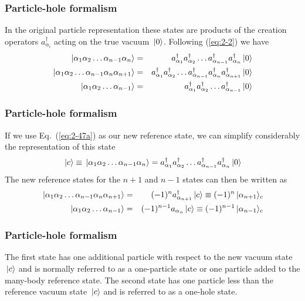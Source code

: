 \frame
{
  \frametitle{Particle-hole formalism}
\begin{small}
{\scriptsize
In the original particle representation these states are products of the creation operators  
$a_{\alpha_i}^\dagger$ acting on the true vacuum $\,|{0}\rangle$.
Following (\ref{eq:2-2}) we have 
\begin{eqnarray}
	\ket{\alpha_1\alpha_2\dots\alpha_{n-1}\alpha_n} &=& a_{\alpha_1}^\dagger a_{\alpha_2}^\dagger \dots
					a_{\alpha_{n-1}}^\dagger a_{\alpha_n}^\dagger \ket{0} \label{eq:2-47a} \\
	\ket{\alpha_1\alpha_2\dots\alpha_{n-1}\alpha_n\alpha_{n+1}} &=&
		a_{\alpha_1}^\dagger a_{\alpha_2}^\dagger \dots a_{\alpha_{n-1}}^\dagger a_{\alpha_n}^\dagger
		a_{\alpha_{n+1}}^\dagger \ket{0} \label{eq:2-47b} \\
	\ket{\alpha_1\alpha_2\dots\alpha_{n-1}} &=& a_{\alpha_1}^\dagger a_{\alpha_2}^\dagger \dots
		a_{\alpha_{n-1}}^\dagger \ket{0} \label{eq:2-47c}
\end{eqnarray}
}
\end{small}
}

\frame
{
  \frametitle{Particle-hole formalism}
\begin{small}
{\scriptsize
If we use Eq.~(\ref{eq:2-47a}) as our new reference state, we can simplify considerably the representation of 
this state
\begin{equation}
	\ket{c} \equiv \ket{\alpha_1\alpha_2\dots\alpha_{n-1}\alpha_n} =
		a_{\alpha_1}^\dagger a_{\alpha_2}^\dagger \dots a_{\alpha_{n-1}}^\dagger a_{\alpha_n}^\dagger \ket{0} \label{eq:2-48a}
\end{equation}
The new reference states for the $n+1$ and $n-1$ states can then be written as
\begin{eqnarray}
	\ket{\alpha_1\alpha_2\dots\alpha_{n-1}\alpha_n\alpha_{n+1}} &=& (-1)^n a_{\alpha_{n+1}}^\dagger \ket{c}
		\equiv (-1)^n \ket{\alpha_{n+1}}_c \label{eq:2-48b} \\
	\ket{\alpha_1\alpha_2\dots\alpha_{n-1}} &=& (-1)^{n-1} a_{\alpha_n} \ket{c} 
		\equiv (-1)^{n-1} \ket{\alpha_{n-1}}_c \label{eq:2-48c} 
\end{eqnarray}
}
\end{small}
}

\frame
{
  \frametitle{Particle-hole formalism}
\begin{small}
{\scriptsize
The first state has one additional particle with respect to the new vacuum state
$\,|{c}\rangle$  and is normally referred to as a one-particle state or one particle added to the 
many-body reference state. 
The second state has one particle less than the reference vacuum state  $\,|{c}\rangle$ and is referred to as
a one-hole state. 
}
\end{small}
}

